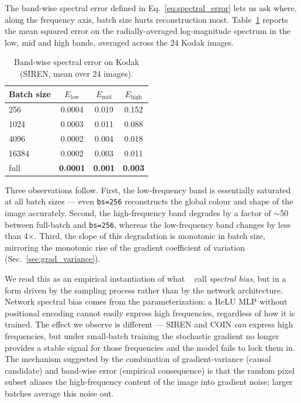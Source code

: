 \documentclass[a4paper,oneside,11pt,english]{scrartcl}
\begin{document}
The band-wise spectral error defined in Eq.~\ref{eq:spectral_error} lets us
ask where, along the frequency axis, batch size hurts reconstruction most.
Table~\ref{tab:spectral_bands} reports the mean squared error on the
radially-averaged log-magnitude spectrum in the low, mid and high bands,
averaged across the 24 Kodak images.

\begin{table}[H]
\centering
\caption{Band-wise spectral error on Kodak (SIREN, mean over 24 images).}
\label{tab:spectral_bands}
\begin{tabular}{lccc}
\toprule
Batch size & $E_{\text{low}}$ & $E_{\text{mid}}$ & $E_{\text{high}}$ \\
\midrule
256        & 0.0004 & 0.019 & 0.152 \\
1024       & 0.0003 & 0.011 & 0.088 \\
4096       & 0.0002 & 0.004 & 0.018 \\
16384      & 0.0002 & 0.003 & 0.011 \\
full       & \textbf{0.0001} & \textbf{0.001} & \textbf{0.003} \\
\bottomrule
\end{tabular}
\end{table}

Three observations follow.  First, the low-frequency band is essentially
saturated at all batch sizes --- even \texttt{bs=256} reconstructs the global
colour and shape of the image accurately.  Second, the high-frequency band
degrades by a factor of $\sim$50 between full-batch and \texttt{bs=256},
whereas the low-frequency band changes by less than 4$\times$.  Third, the
slope of this degradation is monotonic in batch size, mirroring the monotonic
rise of the gradient coefficient of variation
(Sec.~\ref{sec:grad_variance}).

We read this as an empirical instantiation of what
~\cite{rahaman2019spectral} call \emph{spectral bias}, but in a form
driven by the sampling process rather than by the network architecture.
Network spectral bias comes from the parameterization: a ReLU MLP without
positional encoding cannot easily express high frequencies, regardless of
how it is trained.  The effect we observe is different --- SIREN and COIN
\emph{can} express high frequencies, but under small-batch training the
stochastic gradient no longer provides a stable signal for those frequencies
and the model fails to lock them in.  The mechanism suggested by the
combination of gradient-variance (causal candidate) and band-wise error
(empirical consequence) is that the random pixel subset aliases the
high-frequency content of the image into gradient noise; larger batches
average this noise out.
\end{document}

